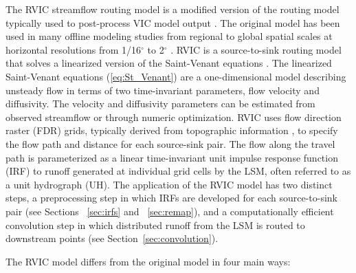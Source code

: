 \documentclass[jgrga, draft]{agutex}
\begin{document}
\begin{article}
\begin{itemize}[leftmargin=+.5in]
The RVIC streamflow routing model is a modified version of the routing model typically used to post-process VIC model output \citep{Lohmann_1996, Lohmann_1998a}.
The original \citet{Lohmann_1996} model has been used in many offline modeling studies from regional to global spatial scales at horizontal resolutions from 1/16$^{\circ}$ to 2$^{\circ}$ \citep[e.g.][]{Nijssen_1997,Lohmann_1998b,Su_2005,Hamlet_2013}.
RVIC is a source-to-sink routing model that solves a linearized version of the Saint-Venant equations \citep{Fread_1992,Mesa_1986}.
The linearized Saint-Venant equations (\ref{eq:St_Venant}) are a one-dimensional model describing unsteady flow in terms of two time-invariant parameters, flow velocity and diffusivity.
The velocity and diffusivity parameters can be estimated from observed streamflow or through numeric optimization.
RVIC uses flow direction raster (FDR) grids, typically derived from topographic information \citep[e.g.][]{Wu_2011}, to specify the flow path and distance for each source-sink pair.
The flow along the travel path is parameterized as a linear time-invariant unit impulse response function (IRF) to runoff generated at individual grid cells by the LSM, often referred to as a unit hydrograph (UH).
The application of the RVIC model has two distinct steps, a preprocessing step in which IRFs are developed for each source-to-sink pair (see Sections ~\ref{sec:irfs} and ~\ref{sec:remap}), and a computationally efficient convolution step in which distributed runoff from the LSM is routed to downstream points (see Section~\ref{sec:convolution}).

The RVIC model differs from the original \citet{Lohmann_1996} model in four main ways:

\end{itemize}
\end{article}
\end{document}

